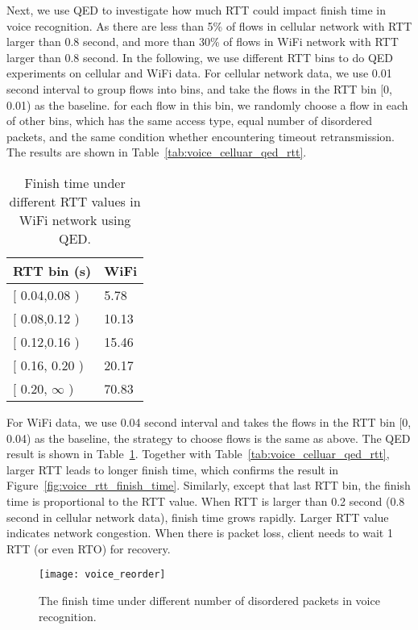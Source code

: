 Next, we use QED to investigate how much RTT could impact finish time in voice recognition. As there are less than 5\% of flows in cellular network with RTT larger than 0.8 second, and more than 30\% of flows in WiFi network with RTT larger than 0.8 second. In the following, we use different RTT bins to do QED experiments on cellular and WiFi data. For cellular network data, we use 0.01 second interval to group flows into bins, and take the flows in the RTT bin $[$0, 0.01) as the baseline. for each flow in this bin, we randomly choose a flow in each of other bins, which has the same access type, equal number of disordered packets, and the same condition whether encountering timeout retransmission. The results are shown in Table~\ref{tab:voice_celluar_qed_rtt}.

\begin{table}[th]
\caption{Finish time under different RTT values in WiFi network using QED.}
\label{tab:voice_wifi_qed_rtt}
\centering
\renewcommand{\arraystretch}{1.2}
\begin{tabular}{l|l}
	\toprule
	RTT bin (s) & WiFi \\
	\midrule
	$[$ 0.04,0.08 ) & 5.78 \\
	\hline
	$[$ 0.08,0.12 ) & 10.13 \\
	\hline
	$[$ 0.12,0.16 ) & 15.46 \\
	\hline
	$[$ 0.16, 0.20 ) & 20.17 \\
	\hline
	$[$ 0.20, $\infty$ ) & 70.83 \\
	\bottomrule
\end{tabular}
\end{table}

For WiFi data, we use 0.04 second interval and takes the flows in the RTT bin $[$0, 0.04) as the baseline, the strategy to choose flows is the same as above. The QED result is shown in Table~\ref{tab:voice_wifi_qed_rtt}. Together with Table~\ref{tab:voice_celluar_qed_rtt}, larger RTT leads to longer finish time, which confirms the result in Figure~\ref{fig:voice_rtt_finish_time}. Similarly, except that last RTT bin, the finish time is proportional to the RTT value. When RTT is larger than 0.2 second (0.8 second in cellular network data), finish time grows rapidly. Larger RTT value indicates network congestion. When there is packet loss, client needs to wait 1 RTT (or even RTO) for recovery.

\begin{figure}[th]
\centering
\texttt{[image: voice\_reorder]}
\caption{The finish time under different number of disordered packets in voice recognition.}
\label{fig:voice_reorder}
\end{figure}

